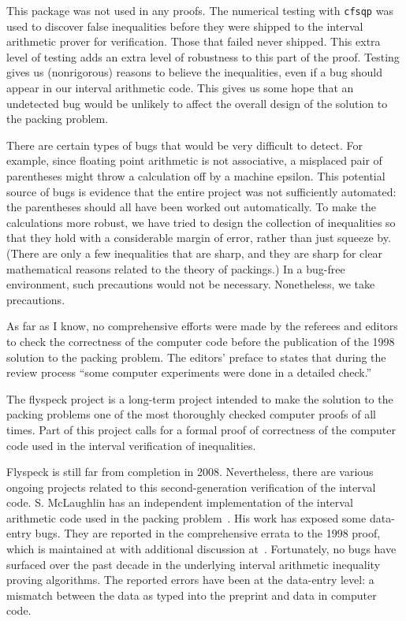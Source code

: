This package was not used in any proofs.  The numerical testing with
{\tt cfsqp} was used to discover false inequalities before they were
shipped to the interval arithmetic prover for verification.  Those
that failed never shipped.  This extra level of testing adds an extra
level of robustness to this part of the proof.  Testing gives us
(nonrigorous) reasons to believe the inequalities, even if a bug
should appear in our interval arithmetic code.  This gives us some
hope that an undetected bug would be unlikely to affect the overall
design of the solution to the packing problem.


There are certain types of bugs that would be very difficult to
detect.  For example, since floating point arithmetic is not
associative, a misplaced pair of parentheses might throw a calculation
off by a machine epsilon.  This potential source of bugs is evidence
that the entire project was not sufficiently automated: the
parentheses should all have been worked out automatically.  To make
the calculations more robust, we have tried to design the collection
of inequalities so that they hold with a considerable margin of error,
rather than just squeeze by.  (There are only a few inequalities that
are sharp, and they are sharp for clear mathematical reasons related
to the theory of packings.)  In a bug-free environment, such
precautions would not be necessary.  Nonetheless, we take precautions.

As far as I know, no comprehensive efforts were made by the referees
and editors to check the correctness of the computer code before the
publication of the 1998 solution to the packing problem.  The editors'
preface to \cite{DCG} states that during the review process ``some
computer experiments were done in a detailed check.''


The flyspeck project is a long-term project intended to make the
solution to the packing problems one of the most thoroughly checked
computer proofs of all times.  Part of this project calls for a formal
proof of correctness of the computer code used in the interval
verification of inequalities.

Flyspeck is still far from completion in 2008.  Nevertheless, there
are various ongoing projects related to this second-generation
verification of the interval code.  S. McLaughlin has an independent
implementation of the interval arithmetic code used in the packing
problem~\cite{McL08}.  His work has exposed some data-entry bugs.
They are reported in the comprehensive errata to the 1998 proof, which
is maintained at \cite{errata} with additional discussion
at~\cite{flydis}.  Fortunately, no bugs have surfaced over the past
decade in the underlying interval arithmetic inequality proving
algorithms.  The reported errors have been at the data-entry level: a
mismatch between the data as typed into the preprint and data in
computer code.

